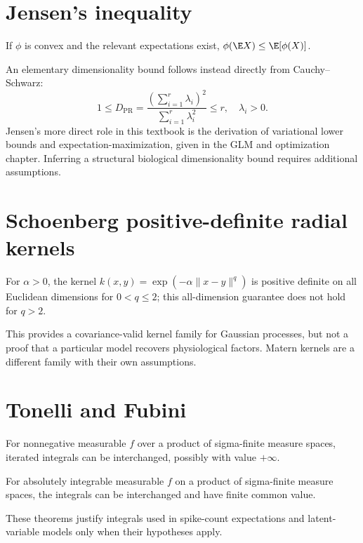 \section{Jensen's inequality}
\begin{theorem}
If $\phi$ is convex and the relevant expectations exist,
$\phi(\E X)\leq\E[\phi(X)]$.
\end{theorem}
An elementary dimensionality bound follows instead directly from
Cauchy--Schwarz:
\[
1\leq D_{\mathrm{PR}}=
\frac{(\sum_{i=1}^r\lambda_i)^2}{\sum_{i=1}^r\lambda_i^2}\leq r,
\quad \lambda_i>0.
\]
Jensen's more direct role in this textbook is the derivation of
variational lower bounds and expectation-maximization, given in the
GLM and optimization chapter. Inferring a structural biological
dimensionality bound requires additional assumptions.

\section{Schoenberg positive-definite radial kernels}
\begin{theorem}
For $\alpha>0$, the kernel
$k(x,y)=\exp(-\alpha\|x-y\|^q)$
is positive definite on all Euclidean dimensions for
$0<q\leq2$; this all-dimension guarantee does not hold
for $q>2$.
\end{theorem}
This provides a covariance-valid kernel family for Gaussian processes,
but not a proof that a particular model recovers physiological factors.
Matern kernels are a different family with their own assumptions.

\section{Tonelli and Fubini}
\begin{theorem}[Tonelli]
For nonnegative measurable $f$ over a product of sigma-finite measure
spaces, iterated integrals can be interchanged, possibly with value
$+\infty$.
\end{theorem}
\begin{theorem}[Fubini]
For absolutely integrable measurable $f$ on a product of
sigma-finite measure spaces, the integrals can be interchanged
and have finite common value.
\end{theorem}
These theorems justify integrals used in spike-count expectations and
latent-variable models only when their hypotheses apply.
